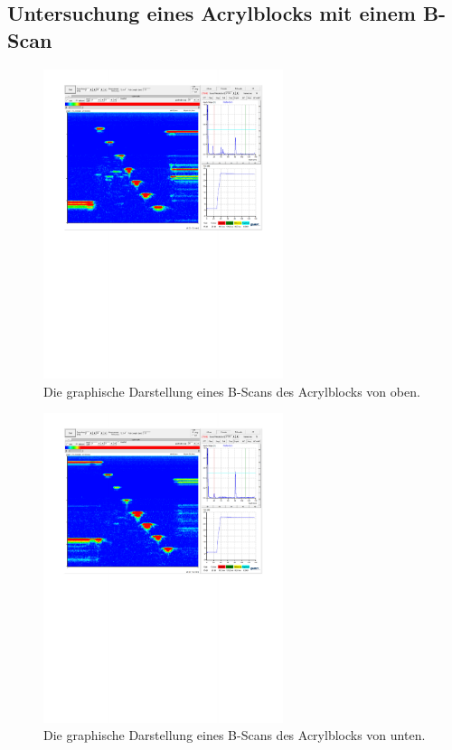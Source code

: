 \subsection{Untersuchung eines Acrylblocks mit einem B-Scan}




\begin{figure}[H]
  \centering
  \includegraphics[width = 7cm]{content/bscan_oben.pdf}
  \caption{Die graphische Darstellung eines B-Scans des Acrylblocks von oben.}
  \label{fig:boben}
\end{figure}

\begin{figure}[H]
  \centering
  \includegraphics[width = 7cm]{content/bscan_unten.pdf}
  \caption{Die graphische Darstellung eines B-Scans des Acrylblocks von unten.}
  \label{fig:bunten}
\end{figure}


